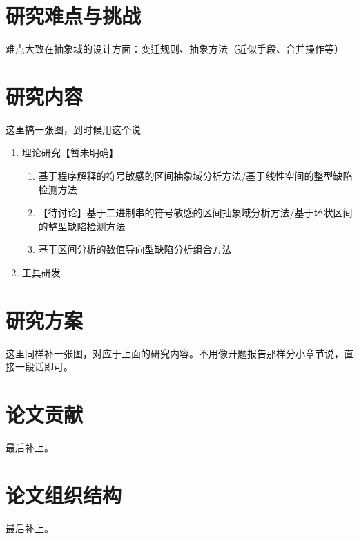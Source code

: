  \section{研究难点与挑战}
 
 难点大致在抽象域的设计方面：变迁规则、抽象方法（近似手段、合并操作等）
 
 \section{研究内容}
 
 这里搞一张图，到时候用这个说
 
 \begin{enumerate}
 	
 	\item 理论研究【暂未明确】
	 	\begin{enumerate}
	 		\item 基于程序解释的符号敏感的区间抽象域分析方法/基于线性空间的整型缺陷检测方法
	 		\item 【待讨论】基于二进制串的符号敏感的区间抽象域分析方法/基于环状区间的整型缺陷检测方法
	 		\item 基于区间分析的数值导向型缺陷分析组合方法
	 	\end{enumerate}
 	
 	\item 工具研发
 	
 \end{enumerate}
 
 \section{研究方案}
 
 这里同样补一张图，对应于上面的研究内容。不用像开题报告那样分小章节说，直接一段话即可。
 
 \section{论文贡献}
 
 最后补上。
 
 \section{论文组织结构}
 
 最后补上。